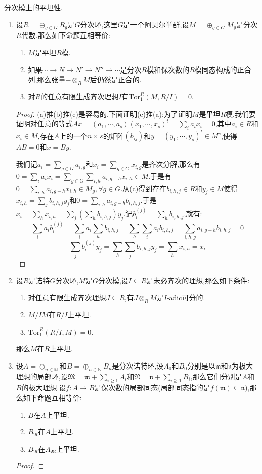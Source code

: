 分次模上的平坦性.
\begin{enumerate}
	\item 设$R=\oplus_{g\in G}R_g$是$G$分次环,这里$G$是一个阿贝尔半群,设$M=\oplus_{g\in G}M_g$是分次$R$代数.那么如下命题互相等价:
	\begin{enumerate}
		\item $M$是平坦$R$模.
		\item 如果$\cdots\to N\to N'\to N''\to\cdots$是分次$R$模和保次数的$R$模同态构成的正合列,那么张量$-\otimes_RM$后仍然是正合的.
		\item 对$R$的任意有限生成齐次理想$I$有$\mathrm{Tor}_1^R(M,R/I)=0$.
	\end{enumerate}
    \begin{proof}
    	
    	(a)推(b)推(c)是容易的.下面证明(c)推(a):为了证明$M$是平坦$R$模,我们要证明对任意的等式$Ax=(a_1,\cdots,a_s)(x_1,\cdots,x_s)^t=\sum_ia_ix_i=0$,其中$a_i\in R$和$x_i\in M$,存在$A$上的一个$n\times s$的矩阵$(b_{ij})$和$y=(y_1,\cdots,y_s)^t\in M^s$,使得$AB=0$和$x=By$.
    	
    	\qquad
    	
    	我们记$a_i=\sum_{g\in G}a_{i,g}$和$x_i=\sum_{g\in G}x_{i,g}$是齐次分解,那么有$0=\sum_ia_ix_i=\sum_{g\in G}\sum_{i,h}a_{i,g-h}x_{i,h}\in M$.于是有$0=\sum_{i,h}a_{i,g-h}x_{i,h}\in M_g,\forall g\in G$.从(c)得到存在$b_{i,h,j}\in R$和$y_j\in M$使得$x_{i,h}=\sum_jb_{i,h,j}y_j$和$0=\sum_{i,h}a_{i,g-h}b_{i,h,j}$.于是$x_i=\sum_hx_{i,h}=\sum_j\left(\sum_hb_{i,h,j}\right)y_j$.记$b_i^{(j)}=\sum_hb_{i,h,j}$,就有:
    	$$\sum_ia_ib_i^{(j)}=\sum_ia_i\sum_hb_{i,h,j}=\sum_h\sum_ia_ib_{i,h,j}=\sum_{i,h,g}a_{i,g-h}b_{i,h,j}=0$$
    	$$\sum_jb_i^{(j)}y_j=\sum_h\sum_jb_{i,h,j}y_j=\sum_hx_{i,h}=x_i$$
    \end{proof}
    \item 设$R$是诺特$G$分次环,$M$是$G$分次模,设$I\subseteq R$是未必齐次的理想,那么如下条件:
    \begin{enumerate}
    	\item 对任意有限生成齐次理想$J\subseteq R$,有$J\otimes_RM$是$I$-adic可分的.
    	\item $M/IM$在$R/I$上平坦.
    	\item $\mathrm{Tor}_1^R(R/I,M)=0$.
    \end{enumerate}
 
    那么$M$在$R$上平坦.
    \item 设$A=\oplus_{n\in\mathbb{N}}$和$B=\oplus_{n\in\mathbb{N}}B_n$是分次诺特环,设$A_0$和$B_0$分别是以$\mathfrak{m}$和$\mathfrak{n}$为极大理想的局部环,设$\mathfrak{M}=\mathfrak{m}+\sum_{i\ge1}A_i$和$\mathfrak{N}=\mathfrak{n}+\sum_{i\ge1}B_i$,那么它们分别是$A$和$B$的极大理想.设$f:A\to B$是保次数的局部同态(局部同态指的是$f(\mathfrak{m})\subseteq\mathfrak{n}$),那么如下命题互相等价:
    \begin{enumerate}
    	\item $B$在$A$上平坦.
    	\item $B_{\mathfrak{N}}$在$A$上平坦.
    	\item $B_{\mathfrak{N}}$在$A_{\mathfrak{M}}$上平坦.
    \end{enumerate}
    \begin{proof}
    	

\end{proof}
\end{enumerate}
